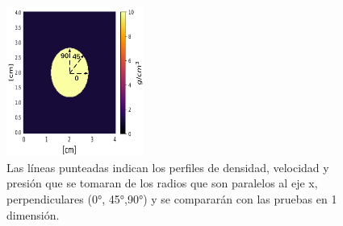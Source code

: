 \documentclass[12pt,a4paper]{book}
\begin{document}
\begin{figure}
  \centering
    \includegraphics[width=0.4\textwidth]{./Figuras/verificacion_del_codigo/pruebas_2D/Example.png}
  \caption{Las líneas punteadas indican los perfiles de densidad, velocidad y presión que se 
  tomaran de los radios que son 
  paralelos al eje x,  perpendiculares (0°, 45°,90°) y se compararán con las pruebas en 
  1 dimensión.}\label{Example_blast_wave}
\end{figure}
\end{document}
